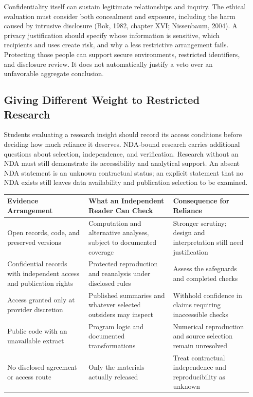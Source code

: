 Confidentiality itself can sustain legitimate relationships and inquiry.
The ethical evaluation must consider both concealment and exposure,
including the harm caused by intrusive disclosure (Bok, 1982, chapter
XVI; Nissenbaum, 2004). A privacy justification should specify whose
information is sensitive, which recipients and uses create risk, and why
a less restrictive arrangement fails. Protecting those people can
support secure environments, restricted identifiers, and disclosure
review. It does not automatically justify a veto over an unfavorable
aggregate conclusion.

\hypertarget{M09-giving-different-weight-to-restricted-research}{%
\subsection{Giving Different Weight to Restricted
Research}\label{M09-giving-different-weight-to-restricted-research}}

\noindent \noindent Students evaluating a research insight should record its
access conditions before deciding how much reliance it deserves.
NDA-bound research carries additional questions about selection,
independence, and verification. Research without an NDA must still
demonstrate its accessibility and analytical support. An absent NDA
statement is an unknown contractual status; an explicit statement that
no NDA exists still leaves data availability and publication selection
to be examined.

\begin{table}[H]
\centering\small
\begin{tabular}{@{}
  >{\raggedright\arraybackslash}p{}
  >{\raggedright\arraybackslash}p{}
  >{\raggedright\arraybackslash}p{}@{}}
\toprule
Evidence Arrangement & What an Independent Reader Can Check &
Consequence for Reliance \\
\midrule

Open records, code, and preserved versions & Computation and alternative
analyses, subject to documented coverage & Stronger scrutiny; design and
interpretation still need justification \\
Confidential records with independent access and publication rights &
Protected reproduction and reanalysis under disclosed rules & Assess the
safeguards and completed checks \\
Access granted only at provider discretion & Published summaries and
whatever selected outsiders may inspect & Withhold confidence in claims
requiring inaccessible checks \\
Public code with an unavailable extract & Program logic and documented
transformations & Numerical reproduction and source selection remain
unresolved \\
No disclosed agreement or access route & Only the materials actually
released & Treat contractual independence and reproducibility as
unknown \\
\bottomrule
\end{tabular}
\end{table}

